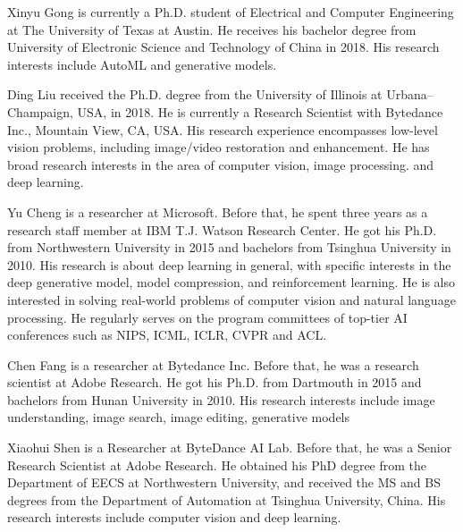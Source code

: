 \documentclass[journal]{IEEEtran}
\begin{document}
\begin{IEEEbiography}
{Xinyu Gong}
 is currently a Ph.D. student of Electrical and Computer Engineering at The University of Texas at Austin. He receives his bachelor degree from University of Electronic Science and Technology of China in 2018. His research interests include AutoML and generative models.
\end{IEEEbiography}

\begin{IEEEbiography}
{Ding Liu}
 received the Ph.D. degree from the University of Illinois at Urbana–
Champaign, USA, in 2018. He is currently a
Research Scientist with Bytedance Inc., Mountain View, CA, USA. His research experience
encompasses low-level vision problems, including
image/video restoration and enhancement. He has
broad research interests in the area of computer
vision, image processing. and deep learning.
\end{IEEEbiography}

\begin{IEEEbiography}
{Yu Cheng}
is  a  researcher  at  Microsoft.  Before  that,  he  spent  three  years as  a  research  staff  member  at  IBM  T.J.  Watson  Research  Center.  He  got  his  Ph.D.  from Northwestern University in 2015 and bachelors from Tsinghua University in 2010. His research is about deep learning in general, with specific interests  in  the  deep  generative  model,  model compression, and reinforcement learning. He is also  interested  in  solving  real-world  problems of  computer  vision  and  natural  language  processing. He regularly serves on the program committees of top-tier AI conferences such as NIPS, ICML, ICLR, CVPR and ACL.
\end{IEEEbiography}

\begin{IEEEbiography}
{Chen Fang}
is  a  researcher  at  Bytedance Inc.  Before  that,  he was a research scientist at Adobe Research. He  got  his  Ph.D.  from Dartmouth in 2015 and bachelors from Hunan University in 2010. His research interests include image understanding, image search, image editing, generative models
\end{IEEEbiography}

\begin{IEEEbiography}
{Xiaohui Shen}
 is a Researcher at ByteDance
AI Lab. Before that, he was a Senior Research
Scientist at Adobe Research. He obtained his
PhD degree from the Department of EECS at
Northwestern University, and received the MS
and BS degrees from the Department of Automation at Tsinghua University, China. His research
interests include computer vision and deep learning.
\end{IEEEbiography}
\end{document}
